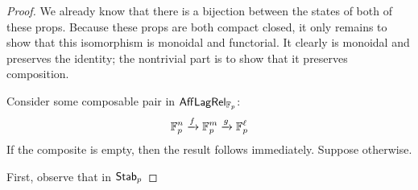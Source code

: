 %


\begin{proof}
We already know that there is a bijection between the states of both of these props. Because these props are both compact closed, it only remains to show that this isomorphism is monoidal and functorial.  It clearly is monoidal and preserves the identity; the nontrivial part is to show that it preserves composition.

Consider some composable pair in $\mathsf{Aff}\mathsf{Lag}\mathsf{Rel}_{\mathbb{F}_p}$:
$$
\mathbb{F}_p^n \xrightarrow{f} \mathbb{F}_p^m \xrightarrow{g} \mathbb{F}_p^\ell
$$
If the composite is empty, then the result follows immediately.  Suppose otherwise.


First, observe that in ${\sf Stab}_p$


\end{proof}
